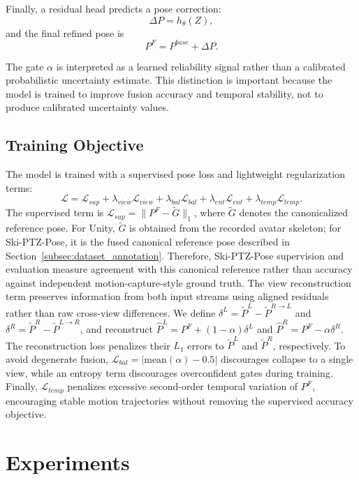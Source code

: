 \documentclass[sigconf,screen]{acmart}
\begin{document}
Finally, a residual head predicts a pose correction:
\[
\Delta P = h_{\theta}(Z),
\]
and the final refined pose is
\[
P^{F} = P^{base} + \Delta P.
\]

The gate \(\alpha\) is interpreted as a learned reliability signal rather than a calibrated probabilistic uncertainty estimate. This distinction is important because the model is trained to improve fusion accuracy and temporal stability, not to produce calibrated uncertainty values.

\subsection{Training Objective}
\label{subsec:training_objective}

The model is trained with a supervised pose loss and lightweight regularization terms:
\[
\mathcal{L}
=
\mathcal{L}_{sup}
+
\lambda_{view}\mathcal{L}_{view}
+
\lambda_{bal}\mathcal{L}_{bal}
+
\lambda_{ent}\mathcal{L}_{ent}
+
\lambda_{temp}\mathcal{L}_{temp}.
\]
The supervised term is \(\mathcal{L}_{sup}=\|P^{F}-\tilde{G}\|_{1}\), where \(\tilde{G}\) denotes the canonicalized reference pose. For Unity, \(\tilde{G}\) is obtained from the recorded avatar skeleton; for Ski-PTZ-Pose, it is the fused canonical reference pose described in Section~\ref{subsec:dataset_annotation}. Therefore, Ski-PTZ-Pose supervision and evaluation measure agreement with this canonical reference rather than accuracy against independent motion-capture-style ground truth. The view reconstruction term preserves information from both input streams using aligned residuals rather than raw cross-view differences. We define \(\delta^{L}=\tilde{P}^{L}-\tilde{P}^{R\rightarrow L}\) and \(\delta^{R}=\tilde{P}^{R}-\tilde{P}^{L\rightarrow R}\), and reconstruct \(\hat{P}^{L}=P^{F}+(1-\alpha)\delta^{L}\) and \(\hat{P}^{R}=P^{F}-\alpha\delta^{R}\). The reconstruction loss penalizes their \(L_{1}\) errors to \(\tilde{P}^{L}\) and \(\tilde{P}^{R}\), respectively. To avoid degenerate fusion, \(\mathcal{L}_{bal}=|\mathrm{mean}(\alpha)-0.5|\) discourages collapse to a single view, while an entropy term discourages overconfident gates during training. Finally, \(\mathcal{L}_{temp}\) penalizes excessive second-order temporal variation of \(P^{F}\), encouraging stable motion trajectories without removing the supervised accuracy objective.

\section{Experiments}
\end{document}
